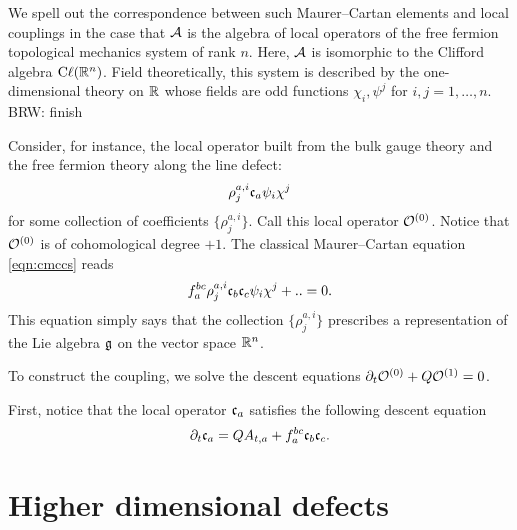 \documentclass[11pt]{amsart}
\def\Cl{{\rm C}\ell}
\def\brian#1{{\textcolor{blue!65!red}{BRW: {#1}}}}
\begin{document}
We spell out the correspondence between such Maurer--Cartan elements and local couplings in the case that $\mathcal A$ is the algebra of local operators of the free fermion topological mechanics system of rank $n$. 
Here, $\mathcal A$ is isomorphic to the Clifford algebra $\Cl(\RR^n)$. 
Field theoretically, this system is described by the one-dimensional theory on $\mathbb R$ whose fields are odd functions $\chi_i, \psi^j$ for $i,j=1,\ldots, n$. 
\brian{finish}

Consider, for instance, the local operator built from the bulk gauge theory and the free fermion theory along the line defect:
\[
\rho_j^{a,i} \mathfrak c_a \psi_i \chi^j 
\]
for some collection of coefficients $\{\rho_j^{a,i}\}$. 
Call this local operator $\mathcal O^{(0)}$. 
Notice that $\mathcal O^{(0)}$ is of cohomological degree $+1$.
The classical Maurer--Cartan equation \eqref{eqn:cmccs} reads
\[
f_a^{bc} \rho_j^{a,i} \mathfrak c_b \mathfrak c_c \psi_i \chi^j + .. = 0. 
\]
This equation simply says that the collection $\{\rho_j^{a,i}\}$ prescribes a representation of the Lie algebra $\mathfrak g$ on the vector space $\mathbb R^n$. 

 


To construct the coupling, we solve the descent equations $\partial_t \mathcal O^{(0)} + Q \mathcal O^{(1)} = 0$.

First, notice that the local operator $\mathfrak c_a$ satisfies the following descent equation
\[
\partial_t \mathfrak c_a = Q A_{t, a} + f_{a}^{bc} \mathfrak c_b \mathfrak c_c .
\]


\section{Higher dimensional defects} 

\end{document}
